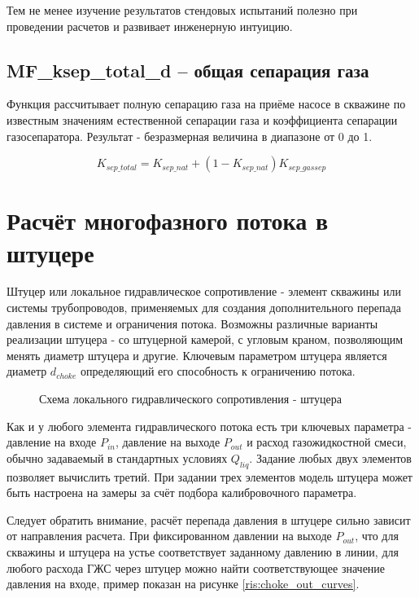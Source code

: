Тем не менее изучение результатов стендовых испытаний полезно при проведении расчетов и развивает инженерную интуицию. 



\subsection{MF\_ksep\_total\_d – общая сепарация газа}

Функция рассчитывает полную сепарацию газа на приёме насосе в скважине по известным значениям естественной сепарации газа и коэффициента сепарации газосепаратора. Результат - безразмерная величина в диапазоне от 0 до 1. 

$$K_{sep\_total} = K_{sep\_nat} + (1-K_{sep\_nat}) K_{sep\_gassep}$$


\section{Расчёт многофазного потока в штуцере}


Штуцер или локальное гидравлическое сопротивление - элемент скважины или системы трубопроводов, применяемых для создания дополнительного перепада давления в системе и ограничения потока. 
Возможны различные варианты реализации штуцера - со штуцерной камерой, с угловым краном, позволяющим менять диаметр штуцера и другие.
Ключевым параметром штуцера является диаметр \(d_{choke} \) определяющий его способность к ограничению потока. 

\begin{figure}[H]
	\begin{center}
	    
		\caption{Схема локального гидравлического сопротивления - штуцера}
		\label{ris:Pipe_choke}
	\end{center}
\end{figure}

Как и у любого элемента гидравлического потока есть три ключевых параметра - давление на входе \( P_{in} \), давление на выходе \(P_{out}\)  и расход газожидкостной смеси, обычно задаваемый в стандартных условиях \(Q_{liq} \). Задание любых двух элементов позволяет вычислить третий. При задании трех элементов модель штуцера может быть настроена на замеры за счёт подбора калибровочного параметра.

Следует обратить внимание, расчёт перепада давления в штуцере сильно зависит от направления расчета. При фиксированном давлении на выходе $P_{out}$, что для скважины и штуцера на устье соответствует заданному давлению в линии, для любого расхода ГЖС через штуцер можно найти соответствующее значение давления на входе, пример показан на рисунке \ref{ris:choke_out_curves}.
 
